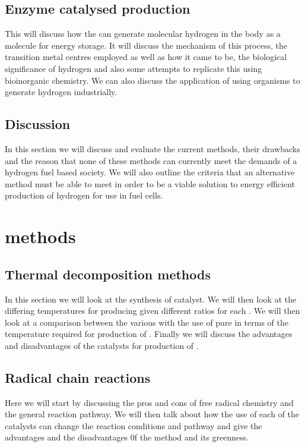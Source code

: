 \documentclass[a4paper]{article}
\begin{document}
\subsection{Enzyme catalysed production}%
\label{sub:enzyme_catalysed_production}

This will discuss how the  can generate molecular hydrogen in the body as a molecule for energy storage. 
It will discuss the mechanism of this process, the transition metal centres employed as well as how it came to be, the biological significance of hydrogen and also some attempts to replicate this using bioinorganic chemistry.
We can also discuss the application of using organisms to generate hydrogen industrially.

\subsection{Discussion}%
\label{sub:discussion_trad}
In this section we will discuss and evaluate the current methods, their drawbacks and the reason that none of these methods can currently meet the demands of a hydrogen fuel based society.
We will also outline the criteria that an alternative method must be able to meet in order to be a viable solution to energy efficient production of hydrogen for use in fuel cells.

\section{ methods}%
\label{sub:ch4_methods}

\subsection{Thermal decomposition methods}%
\label{sub:Thermal_decomposition_methods}
In this section we will look at the synthesis of  catalyst.
We will then look at the differing temperatures for producing  given different  ratios for each .
We will then look at a comparison between the various  with the use of pure  in terms of the temperature required for production of .
Finally we will discuss the advantages and disadvantages of the  catalysts for production of .

\subsection{Radical chain reactions}%
\label{sub:Radical_chain_reactions}
Here we will start by discussing the pros and cons of free radical chemistry and the general reaction pathway. 
We will then talk about how the use of each of the catalysts can change the reaction conditions and pathway and give the advantages and the disadvantages 0f the method and its greenness.
\end{document}
